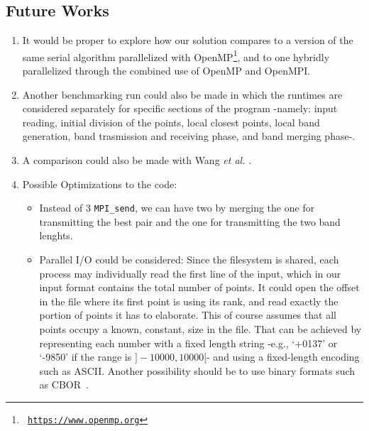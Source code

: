 \subsection{Future Works}
\label{subsec:future_works}
\begin{enumerate}
    \item It would be proper to explore how our solution compares to a version of the same serial algorithm parallelized with OpenMP\footnote{\texttt{ \url{https://www.openmp.org}}}, and to one hybridly parallelized through the combined use of OpenMP and OpenMPI.

    \item Another benchmarking run could also be made in which the runtimes are considered separately for specific sections of the program -namely: input reading, initial division of the points, local closest points, local band generation, band trasmission and receiving phase, and band merging phase-.

    \item A comparison could also be made with Wang \textit{et al.} \cite{wang2020parallel}.

    \item Possible Optimizations to the code:
          \begin{itemize}
              \item Instead of 3 \verb|MPI_send|, we can have two by merging the one for transmitting the best pair and the one for transmitting the two band lenghts.
              \item Parallel I/O could be considered: Since the filesystem is shared, each process may individually read the first line of the input, which in our input format contains the total number of points. It could open the offset in the file where its first point is using its rank, and read exactly the portion of points it has to elaborate. This of course assumes that all points occupy a known, constant, size in the file. That can be achieved by representing each number with a fixed length string -e.g., `+0137' or `-9850' if the range is $] -10000, 10000 [$- and using a fixed-length encoding such as ASCII. Another possibility should be to use binary formats such as CBOR~\cite{bormann2013cbor}.
          \end{itemize}

\end{enumerate}

